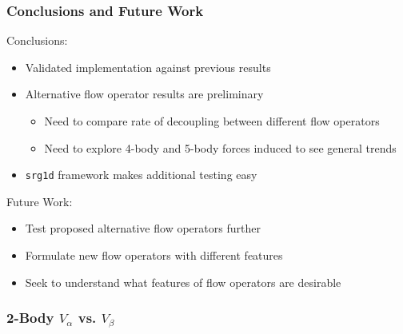 \documentclass{beamer}
\newcommand{\backupbegin}{
   \newcounter{finalframe}
   \setcounter{finalframe}{\value{framenumber}}
}
\begin{document}
{\begin{frame}
\frametitle{Conclusions and Future Work}
Conclusions:
\begin{itemize}
    \item Validated implementation against previous results
    \item Alternative flow operator results are preliminary
    \begin{itemize}
        \item Need to compare rate of decoupling between different flow operators
        \item Need to explore 4-body and 5-body forces induced to see general trends
    \end{itemize}
    \item \texttt{srg1d} framework makes additional testing easy
\end{itemize}
\pause
Future Work:
\begin{itemize}
    \item Test proposed alternative flow operators further
    \item Formulate new flow operators with different features
    \item Seek to understand what features of flow operators are desirable
\end{itemize}

\end{frame}

\appendix

\backupbegin
\begin{frame}
\frametitle{2-Body $V_\alpha$ vs. $V_\beta$}
\begin{figure}
\begin{center}
\end{center}
\end{figure}
\end{frame}

}
\end{document}
